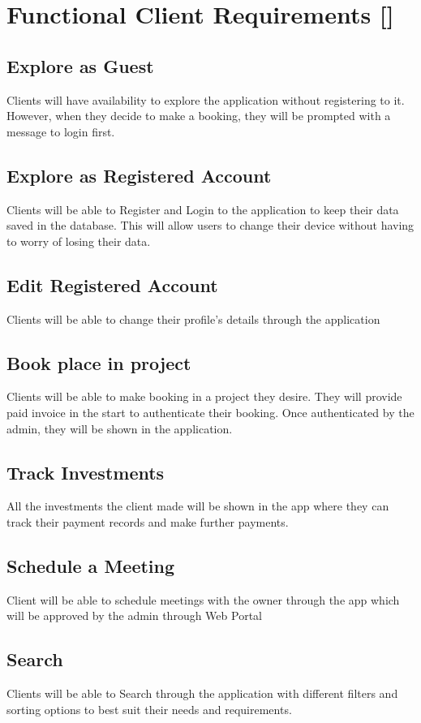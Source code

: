 \section{Functional Client Requirements []}
\subsection{Explore as Guest}
Clients will have availability to explore the application without registering to it. However, when they decide to make a booking, they will be prompted with a message to login first.
\subsection{Explore as Registered Account}
Clients will be able to Register and Login to the application to keep their data saved in the database. This will allow users to change their device without having to worry of losing their data.
\subsection{Edit Registered Account}
Clients will be able to change their profile's details through the application
\subsection{Book place in project}
Clients will be able to make booking in a project they desire. They will provide paid invoice in the start to authenticate their booking. Once authenticated by the admin, they will be shown in the application.
\subsection{Track Investments}
All the investments the client made will be shown in the app where they can track their payment records and make further payments.
\subsection{Schedule a Meeting}
Client will be able to schedule meetings with the owner through the app which will be approved by the admin through Web Portal
\subsection{Search}
Clients will be able to Search through the application with different filters and sorting options to best suit their needs and requirements.
